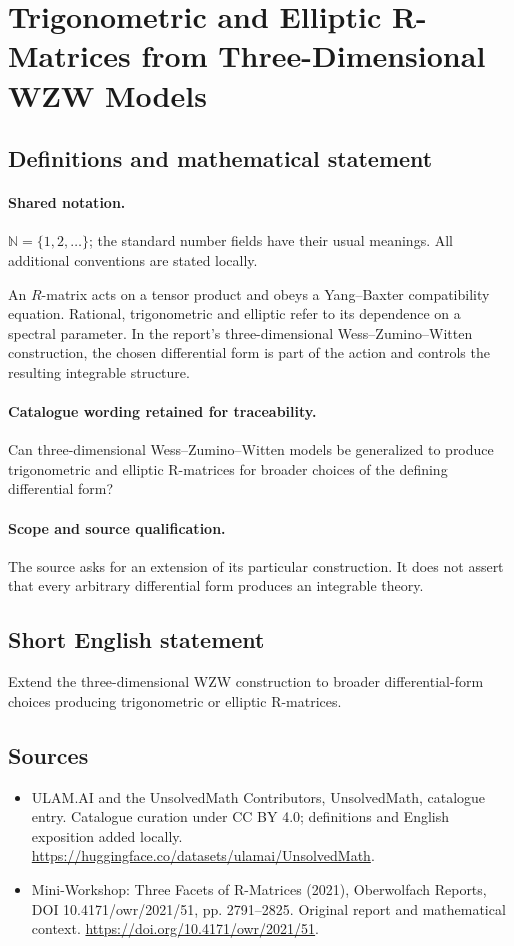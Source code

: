 \documentclass[11pt]{article}
\begin{document}
\section{Trigonometric and Elliptic R-Matrices from Three-Dimensional WZW Models}\label{statement}

\subsection{Definitions and mathematical statement}

\paragraph{Shared notation.}$\mathbb N=\{1,2,\ldots\}$; the standard number fields have their usual meanings. All additional conventions are stated locally.


An $R$-matrix acts on a tensor product and obeys a Yang--Baxter compatibility equation. Rational, trigonometric and elliptic refer to its dependence on a spectral parameter. In the report's three-dimensional Wess--Zumino--Witten construction, the chosen differential form is part of the action and controls the resulting integrable structure.

\paragraph{Catalogue wording retained for traceability.}
Can three-dimensional Wess–Zumino–Witten models be generalized to produce trigonometric and elliptic R-matrices for broader choices of the defining differential form?

\paragraph{Scope and source qualification.}The source asks for an extension of its particular construction. It does not assert that every arbitrary differential form produces an integrable theory.
\subsection{Short English statement}
Extend the three-dimensional WZW construction to broader differential-form choices producing trigonometric or elliptic R-matrices.
\subsection{Sources}
\begin{itemize}
\item[\hypertarget{source:statement:1}{S1}] ULAM.AI and the UnsolvedMath Contributors, UnsolvedMath, catalogue entry. Catalogue curation under CC BY 4.0; definitions and English exposition added locally.
\url{https://huggingface.co/datasets/ulamai/UnsolvedMath}.
\item[\hypertarget{source:statement:2}{S2}] Mini-Workshop: Three Facets of R-Matrices (2021), Oberwolfach Reports, DOI 10.4171/owr/2021/51, pp. 2791--2825. Original report and mathematical context.
\url{https://doi.org/10.4171/owr/2021/51}.
\end{itemize}
\label{end:statement}
\end{document}
